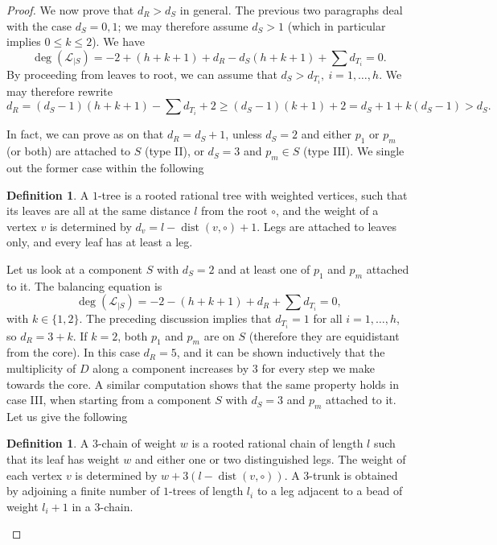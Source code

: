 \documentclass[11pt]{amsart}
\theoremstyle{plain}
\theoremstyle{definition}
\newtheorem{dfn}[thm]{Definition}
\begin{document}
\begin{proof}
 We now prove that $d_R>d_S$ in general. The previous two paragraphs deal with the case $d_S=0,1$; we may therefore assume $d_S>1$ (which in particular implies $0\leq k\leq 2$). We have
 \[\deg(\mathcal L_{|S})= -2+(h+k+1)+d_R-d_S(h+k+1)+\sum d_{T_i}=0.\]
 By proceeding from leaves to root, we can assume that $d_S>d_{T_i},\ i=1,\ldots,h$. We may therefore rewrite
 \[d_R=(d_S-1)(h+k+1)-\sum d_{T_i}+2\geq(d_S-1)(k+1)+2=d_S+1+k(d_S-1)>d_S.\]
 
In fact, we can prove as on \cite[p.893]{SMY1} that $d_R=d_S+1$, unless $d_S=2$ and either $p_1$ or $p_m$ (or both) are attached to $S$ (type II), or $d_S=3$ and $p_m\in S$ (type III). We single out the former case within the following
\begin{dfn}
 A $1$-tree is a rooted rational tree with weighted vertices, such that its leaves are all at the same distance $l$ from the root $\circ$, and the weight of a vertex $v$ is determined by $d_v=l-\operatorname{dist}(v,\circ)+1$. Legs are attached to leaves only, and every leaf has at least a leg.
\end{dfn}
Let us look at a component $S$ with $d_S=2$ and at least one of $p_1$ and $p_m$ attached to it. The balancing equation is
\[\deg(\mathcal L_{|S})= -2-(h+k+1)+d_R+\sum d_{T_i}=0,\]
with $k\in\{1,2\}$. The preceding discussion implies that $d_{T_i}=1$ for all $i=1,\ldots,h$, so $d_R=3+k$. If $k=2$, both $p_1$ and $p_m$ are on $S$ (therefore they are equidistant from the core). In this case $d_R=5$, and it can be shown inductively that the multiplicity of $D$ along a component increases by $3$ for every step we make towards the core. A similar computation shows that the same property holds in case III, when starting from a component $S$ with $d_S=3$ and $p_m$ attached to it. Let us give the following
\begin{dfn}
 A $3$-chain of weight $w$ is a rooted rational chain of length $l$ such that its leaf has weight $w$ and either one or two distinguished legs. The weight of each vertex $v$ is determined by $w+3(l-\operatorname{dist}(v,\circ))$. A $3$-trunk is obtained by adjoining a finite number of $1$-trees of length $l_i$ to a leg adjacent to a bead of weight $l_i+1$ in a $3$-chain.
\end{dfn}


\end{proof}
\end{document}
